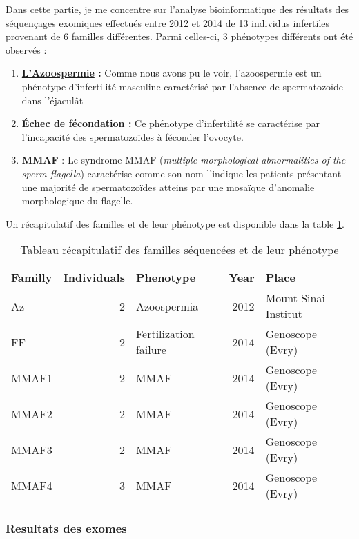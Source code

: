 \documentclass[12pt,twoside]{reedthesis}
\providecommand{\tightlist}{%
  \setlength{\itemsep}{0pt}\setlength{\parskip}{0pt}}
\theoremstyle{definition}
\theoremstyle{definition}
\theoremstyle{remark}
\begin{document}
  Dans cette partie, je me concentre sur l'analyse bioinformatique des
  résultats des séquençages exomiques effectués entre 2012 et 2014 de 13
  individus infertiles provenant de 6 familles différentes. Parmi
  celles-ci, 3 phénotypes différents ont été observés :
  
  \begin{enumerate}
  \def\labelenumi{\arabic{enumi}.}
  \tightlist
  \item
    \textbf{\protect\hyperlink{infquant}{L'Azoospermie} :} Comme nous
    avons pu le voir, l'azoospermie est un phénotype d'infertilité
    masculine caractérisé par l'absence de spermatozoïde dans l'éjaculât\\
  \item
    \textbf{Échec de fécondation :} Ce phénotype d'infertilité se
    caractérise par l'incapacité des spermatozoïdes à féconder
    l'ovocyte.\\
  \item
    \textbf{MMAF} : Le syndrome MMAF (\emph{multiple morphological
    abnormalities of the sperm flagella}) caractérise comme son nom
    l'indique les patients présentant une majorité de spermatozoïdes
    atteins par une mosaïque d'anomalie morphologique du flagelle.
  \end{enumerate}
  
  Un récapitulatif des familles et de leur phénotype est disponible dans
  la table \ref{tab:tabrecapfam}.
  
  \begin{longtable}[t]{lrlrl}
  \caption{\label{tab:tabrecapfam}Tableau récapitulatif des familles séquencées et de leur phénotype}\\
  \toprule
  Familly & Individuals & Phenotype & Year & Place\\
  \midrule
  Az & 2 & Azoospermia & 2012 & Mount Sinai Institut\\
  FF & 2 & Fertilization failure & 2014 & Genoscope (Evry)\\
  MMAF1 & 2 & MMAF & 2014 & Genoscope (Evry)\\
  MMAF2 & 2 & MMAF & 2014 & Genoscope (Evry)\\
  MMAF3 & 2 & MMAF & 2014 & Genoscope (Evry)\\
  MMAF4 & 3 & MMAF & 2014 & Genoscope (Evry)\\
  \bottomrule
  \end{longtable}
  
  \newpage  
  
  \subsubsection{Resultats des exomes}\label{resultats-des-exomes}
  
\end{document}
